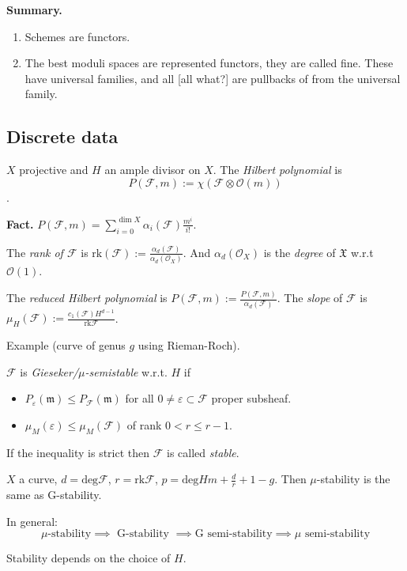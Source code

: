 {\bf Summary.}
\begin{enumerate}
\item Schemes are functors.
\item The best moduli spaces are represented functors, they are called fine.
These have universal families, and all [all what?] are pullbacks of from the
universal family.
\end{enumerate}

\subsection*{Discrete data}
\label{subsection-discrete-data}

$X$ projective and $H$ an ample divisor on $X$. The {\it Hilbert polynomial} is
$$
P(\mathcal{F},m):=\chi(\mathcal{F}\otimes \mathcal{O}(m))
$$.

{\bf Fact.} $P(\mathcal{F},m)=\sum_{i=0}^{\dim
X}\alpha_i(\mathcal{F})\frac{m^i}{i!}$.

The {\it rank of $\mathcal{F}$} is
$\text{rk}(\mathcal{F}):=\frac{\alpha_d(\mathcal{F})}{\alpha_d(\mathcal{O}_X)}$.
And $\alpha_d(\mathcal{O}_X)$ is the {\it degree} of $\mathfrak{X}$ w.r.t
$\mathcal{O}(1)$.

The {\it reduced Hilbert polynomial} is
$P(\mathcal{F},m):=\frac{P(\mathcal{F},m)}{\alpha_d(\mathcal{F})}$. The {\it
slope} of $\mathcal{F}$ is
$\mu_H(\mathcal{F}):=\frac{c_1(\mathcal{F})H^{d-1}}{\text{rk}\mathcal{F}}$.

Example (curve of genus $g$ using Rieman-Roch).

\begin{definition}
\label{definition-Gieseker-and-mu-stability}
$\mathcal{F}$ is {\it Gieseker/$\mu$-semistable} w.r.t. $H$ if
\begin{itemize}
\item $P_\varepsilon(\mathfrak{m})\leq P_{\mathcal{F}}(\mathfrak{m})$ for all $0
\neq  \varepsilon \subset \mathcal{F}$ proper subsheaf.
\item $\mu_{M}(\varepsilon) \leq  \mu_{M}(\mathcal{F})$ of rank $0<r \leq r-1$.
\end{itemize}
If the inequality is strict then $\mathcal{F}$ is called {\it stable}.
\end{definition}

\begin{example}
\label{example-G-and-mu-stability-coincide-in-curve}
$X$ a curve, $d=\text{deg}\mathcal{F}$, $r=\text{rk}\mathcal{F}$,
$p=\text{deg}Hm+\frac{d}{r}+1-g$. Then $\mu$-stability is the same as
G-stability.
\end{example}
In general:
$$
\mu\text{-stability}\implies \text{ G-stability }\implies \text{G semi-stability
}\implies \mu \text{ semi-stability}
$$
\begin{remark}
\label{remark-stability-depends-on-H}
Stability depends on the choice of $H$.
\end{remark}

